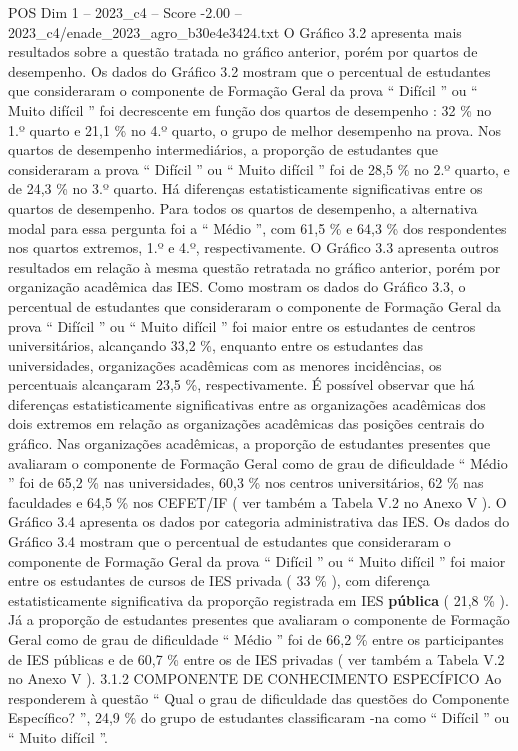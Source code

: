 \begin{textsample}{POS Dim 1 – 2023\_c4 – Score -2.00 – 2023\_c4/enade\_2023\_agro\_b30e4e3424.txt}
O Gráfico 3.2 apresenta mais resultados sobre a questão tratada no gráfico anterior, porém por quartos de desempenho.
Os dados do Gráfico 3.2 mostram que o percentual de estudantes que consideraram o componente de Formação Geral da prova “ Difícil ” ou “ Muito difícil ” foi decrescente em função dos quartos de desempenho : 32 \% no 1.º quarto e 21,1 \% no 4.º quarto, o grupo de melhor desempenho na prova.
Nos quartos de desempenho intermediários, a proporção de estudantes que consideraram a prova “ Difícil ” ou “ Muito difícil ” foi de 28,5 \% no 2.º quarto, e de 24,3 \% no 3.º quarto.
Há diferenças estatisticamente significativas entre os quartos de desempenho.
Para todos os quartos de desempenho, a alternativa modal para essa pergunta foi a “ Médio ”, com 61,5 \% e 64,3 \% dos respondentes nos quartos extremos, 1.º e 4.º, respectivamente.
O Gráfico 3.3 apresenta outros resultados em relação à mesma questão retratada no gráfico anterior, porém por organização acadêmica das IES.
Como mostram os dados do Gráfico 3.3, o percentual de estudantes que consideraram o componente de Formação Geral da prova “ Difícil ” ou “ Muito difícil ” foi maior entre os estudantes de centros universitários, alcançando 33,2 \%, enquanto entre os estudantes das universidades, organizações acadêmicas com as menores incidências, os percentuais alcançaram 23,5 \%, respectivamente.
É possível observar que há diferenças estatisticamente significativas entre as organizações acadêmicas dos dois extremos em relação as organizações acadêmicas das posições centrais do gráfico.
Nas organizações acadêmicas, a proporção de estudantes presentes que avaliaram o componente de Formação Geral como de grau de dificuldade “ Médio ” foi de 65,2 \% nas universidades, 60,3 \% nos centros universitários, 62 \% nas faculdades e 64,5 \% nos CEFET/IF ( ver também a Tabela V.2 no Anexo V ).
O Gráfico 3.4 apresenta os dados por categoria administrativa das IES.
Os dados do Gráfico 3.4 mostram que o percentual de estudantes que consideraram o componente de Formação Geral da prova “ Difícil ” ou “ Muito difícil ” foi maior entre os estudantes de cursos de IES privada ( 33 \% ), com diferença estatisticamente significativa da proporção registrada em IES \textbf{pública} ( 21,8 \% ).
Já a proporção de estudantes presentes que avaliaram o componente de Formação Geral como de grau de dificuldade “ Médio ” foi de 66,2 \% entre os participantes de IES públicas e de 60,7 \% entre os de IES privadas ( ver também a Tabela V.2 no Anexo V ). 3.1.2 COMPONENTE DE CONHECIMENTO ESPECÍFICO Ao responderem à questão “ Qual o grau de dificuldade das questões do Componente Específico? ”, 24,9 \% do grupo de estudantes classificaram -na como “ Difícil ” ou “ Muito difícil ”.

\end{textsample}
